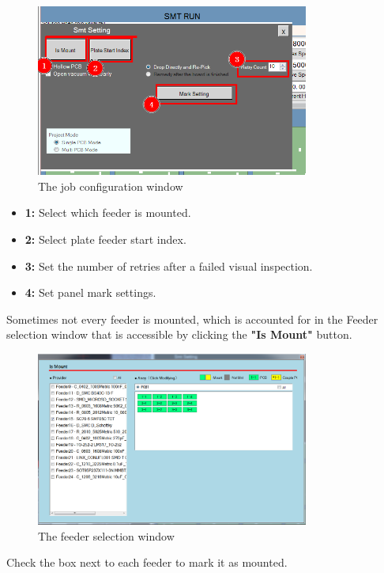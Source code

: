 \documentclass[a4paper,10pt]{report}
\begin{document}
 \begin{figure}[!htb]
 \centering
 \includegraphics[width=0.8\textwidth]{scrot32.png}
 \caption{The job configuration window}
\end{figure}
\begin{itemize}
 \item \textbf{1: } Select which feeder is mounted.
 \item \textbf{2: } Select plate feeder start index.
 \item \textbf{3: } Set the number of retries after a failed visual inspection.
 \item \textbf{4: } Set panel mark settings.
\end{itemize}
\newpage
Sometimes not every feeder is mounted, which is accounted for in the Feeder selection window that is accessible by clicking the \textbf{"Is Mount"} button.\\
 \begin{figure}[!htb]
 \centering
 \includegraphics[width=0.8\textwidth]{scrot33.png}
 \caption{The feeder selection window}
\end{figure}
Check the box next to each feeder to mark it as mounted.\\
\end{document}
